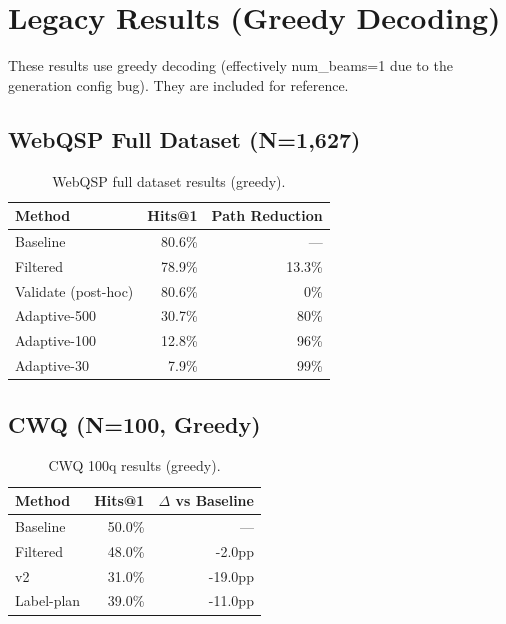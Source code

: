 \documentclass[11pt,twoside]{article}
\begin{document}
\section{Legacy Results (Greedy Decoding)}
\label{sec:legacy}

These results use greedy decoding (effectively num\_beams=1 due to the
generation config bug). They are included for reference.

\subsection{WebQSP Full Dataset (N=1,627)}

\begin{table}[H]
  \centering
  \caption{WebQSP full dataset results (greedy).}
  \label{tab:legacy-webqsp}
  \begin{tabular}{lrr}
    \toprule
    \textbf{Method} & \textbf{Hits@1} & \textbf{Path Reduction} \\
    \midrule
    Baseline & 80.6\% & --- \\
    Filtered & 78.9\% & 13.3\% \\
    Validate (post-hoc) & 80.6\% & 0\% \\
    Adaptive-500 & 30.7\% & 80\% \\
    Adaptive-100 & 12.8\% & 96\% \\
    Adaptive-30 & 7.9\% & 99\% \\
    \bottomrule
  \end{tabular}
\end{table}

\subsection{CWQ (N=100, Greedy)}

\begin{table}[H]
  \centering
  \caption{CWQ 100q results (greedy).}
  \label{tab:legacy-cwq}
  \begin{tabular}{lrr}
    \toprule
    \textbf{Method} & \textbf{Hits@1} & \(\Delta\) vs Baseline \\
    \midrule
    Baseline & 50.0\% & --- \\
    Filtered & 48.0\% & -2.0pp \\
    v2 & 31.0\% & -19.0pp \\
    Label-plan & 39.0\% & -11.0pp \\
    \bottomrule
  \end{tabular}
\end{table}
\end{document}
